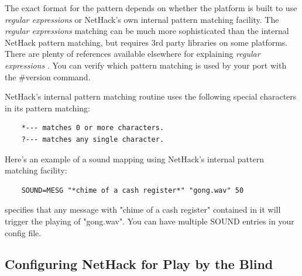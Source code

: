 The exact format for the pattern depends on whether the platform is
built to use {\it regular expressions \/} or NetHack's own internal pattern 
matching facility. The {\it regular expressions \/} matching can be much more 
sophisticated than the internal NetHack pattern matching, but requires 
3rd party libraries on some platforms.  There are plenty of references 
available elsewhere for explaining {\it regular expressions \/}. You can verify 
which pattern matching is used by your port with the 
\#version command.  

NetHack's internal pattern matching routine uses the following
special characters in its pattern matching:

\begin{verbatim}
    *--- matches 0 or more characters.
    ?--- matches any single character.
\end{verbatim}

Here's an example of a sound mapping using NetHack's internal
pattern matching facility:
\begin{verbatim}
    SOUND=MESG "*chime of a cash register*" "gong.wav" 50
\end{verbatim}
specifies that any message with "chime of a cash register" contained
in it will trigger the playing of "gong.wav".  You can have multiple
SOUND entries in your config file.

\subsection*{Configuring NetHack for Play by the Blind}

